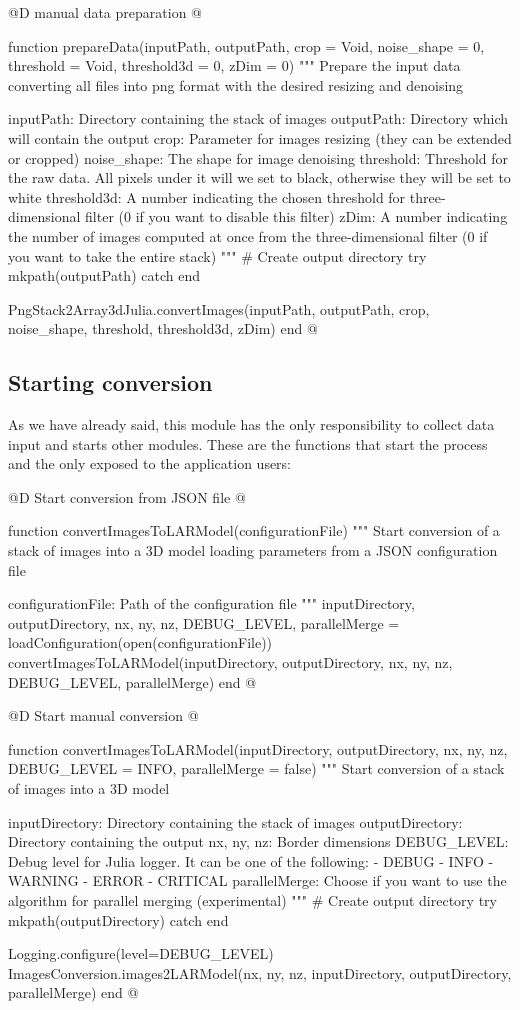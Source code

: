 \documentclass[11pt,oneside]{article}	%
\begin{document}
@D manual data preparation
@{function prepareData(inputPath, outputPath,
		       crop = Void, noise_shape = 0, threshold = Void,
		       threshold3d = 0, zDim = 0)
  """
  Prepare the input data converting all files into png
  format with the desired resizing and denoising

  inputPath: Directory containing the stack of images
  outputPath: Directory which will contain the output
  crop: Parameter for images resizing (they can be
        extended or cropped)
  noise_shape: The shape for image denoising
  threshold: Threshold for the raw data. All pixels under it
             will we set to black, otherwise they will be set to white
  threshold3d: A number indicating the chosen threshold for
	       three-dimensional filter (0 if you want to disable this filter)
  zDim: A number indicating the number of images computed at once from the
	three-dimensional filter (0 if you want to take the entire stack)
  """
  # Create output directory
  try
    mkpath(outputPath)
  catch
  end

  PngStack2Array3dJulia.convertImages(inputPath, outputPath, crop, noise_shape,
				      threshold, threshold3d, zDim)
end
@}

\subsection{Starting conversion}\label{sec:conversion}

As we have already said, this module has the only responsibility to collect data input and starts other modules. These are the functions that start the process and the only exposed to the application users:

@D Start conversion from JSON file
@{function convertImagesToLARModel(configurationFile)
  """
  Start conversion of a stack of images into a 3D model
  loading parameters from a JSON configuration file

  configurationFile: Path of the configuration file
  """
  inputDirectory, outputDirectory, nx, ny, nz,
      DEBUG_LEVEL, parallelMerge = loadConfiguration(open(configurationFile))
  convertImagesToLARModel(inputDirectory, outputDirectory,
			nx, ny, nz, DEBUG_LEVEL, parallelMerge)
end
@}

@D Start manual conversion
@{function convertImagesToLARModel(inputDirectory, outputDirectory,
                                 nx, ny, nz, DEBUG_LEVEL = INFO,
                                 parallelMerge = false)
  """
  Start conversion of a stack of images into a 3D model

  inputDirectory: Directory containing the stack of images
  outputDirectory: Directory containing the output
  nx, ny, nz: Border dimensions
  DEBUG_LEVEL: Debug level for Julia logger. It can be one of the following:
    - DEBUG
    - INFO
    - WARNING
    - ERROR
    - CRITICAL
  parallelMerge: Choose if you want to use the algorithm
  for parallel merging (experimental)
  """
  # Create output directory
  try
    mkpath(outputDirectory)
  catch
  end

  Logging.configure(level=DEBUG_LEVEL)
  ImagesConversion.images2LARModel(nx, ny, nz,
	  inputDirectory, outputDirectory, parallelMerge)
end
@}
\end{document}
